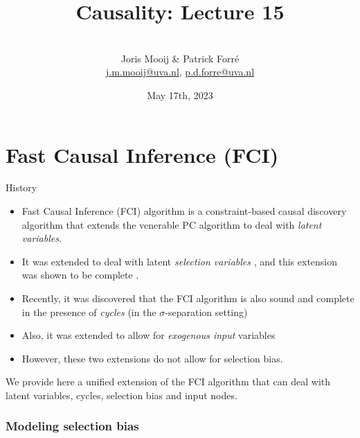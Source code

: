 \title[Causality]{Causality: Lecture 15}
\author[Joris Mooij]{\\[5mm]\large Joris Mooij \& Patrick Forr\'e\\
\url{j.m.mooij@uva.nl}, \url{p.d.forre@uva.nl}}
\date[2022-05-17]{\normalsize May 17th, 2023}
\maketitle

\part{Fast Causal Inference (FCI)}
\frame{\partpage}

\begin{frame}{History}
  \begin{itemize}
    \item Fast Causal Inference (FCI) algorithm \cite{SMR1995} is a constraint-based causal discovery algorithm
      that extends the venerable PC algorithm \cite{SGS2000} to deal with \emph{latent variables}.
    \item It was extended to deal with latent \emph{selection variables} \cite{SMR1999}, and this extension
      was shown to be complete \cite{Zhang2008_AI}.
    \item Recently, it was discovered that the FCI algorithm is also sound and complete in the
      presence of \emph{cycles} (in the $\sigma$-separation setting) \cite{MooijClaassen_UAI_20}
    \item Also, it was extended to allow for \emph{exogenous input} variables \cite{Mooij++_JMLR_20}
    \item However, these two extensions do not allow for selection bias.
  \end{itemize}
  We provide here a unified extension of the FCI algorithm that can deal with latent variables, cycles, selection bias and input nodes.
\end{frame}

\section{Modeling selection bias}
\frame{\sectionpage}

